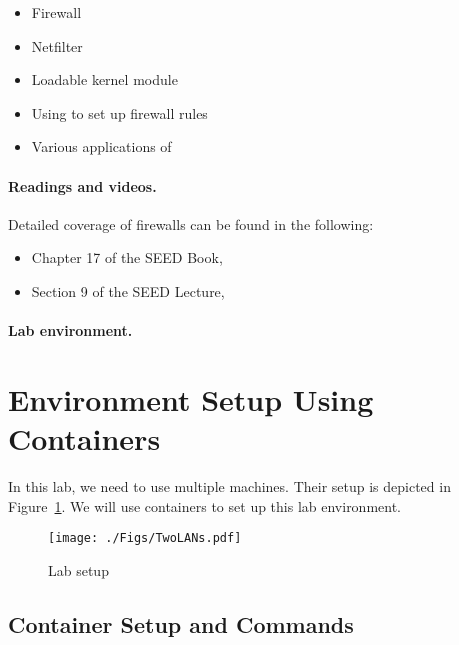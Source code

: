 \begin{itemize}[noitemsep]
\item Firewall
\item Netfilter
\item Loadable kernel module
\item Using \iptables to set up firewall rules
\item Various applications of \iptables
\end{itemize}


\paragraph{Readings and videos.}
Detailed coverage of firewalls can be found in the following:

\begin{itemize}
\item Chapter 17 of the SEED Book, \seedbook
\item Section 9 of the SEED Lecture, \seedisvideo
\end{itemize}


\paragraph{Lab environment.} \seedenvironmentC




\section{Environment Setup Using Containers}


In this lab, we need to use multiple machines. 
Their setup is depicted in Figure~\ref{fig:labsetup}.  
We will use containers to set up this lab environment.


\begin{figure}[htb]
\begin{center}
\texttt{[image: ./Figs/TwoLANs.pdf]}
\end{center}
\caption{Lab setup}
\label{fig:labsetup}
\end{figure}


\subsection{Container Setup and Commands}





